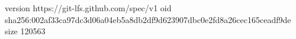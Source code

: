 version https://git-lfs.github.com/spec/v1
oid sha256:002af33ca97dc3d06a04eb5a8db2df9d623907dbc0e2fd8a26cec165ceadf9de
size 120563
